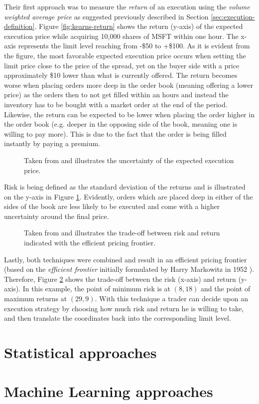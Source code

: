 Their first approach was to measure the \textit{return} of an execution using the \textit{volume weighted average price} as suggested previously described in Section \ref{sec:execution-definition}.
Figure \ref{fig:kearns-return} shows the return (y-axis) of the expected execution price while acquiring 10,000 shares of MSFT within one hour.
The x-axis represents the limit level reaching from -\$50 to +\$100.
As it is evident from the figure, the most favorable expected execution price occurs when setting the limit price close to the price of the spread, yet on the buyer side with a price approximately \$10 lower than what is currently offered.
The return becomes worse when placing orders more deep in the order book (meaning offering a lower price) as the orders then to not get filled within an hours and instead the inventory has to be bought with a market order at the end of the period.
Likewise, the return can be expected to be lower when placing the order higher in the order book (e.g. deeper in the opposing side of the book, meaning one is willing to pay more).
This is due to the fact that the order is being filled instantly by paying a premium.

\begin{figure}[H]
    \centering
    \caption{Taken from \cite{nevmyvaka2005electronic} and illustrates the uncertainty of the expected execution price.}
    \label{fig:kearns-std}
\end{figure}

Risk is being defined as the standard deviation of the returns and is illustrated on the y-axis in Figure \ref{fig:kearns-std}.
Evidently, orders which are placed deep in either of the sides of the book are less likely to be executed and come with a higher uncertainty around the final price.

\begin{figure}[H]
    \centering
    \caption{Taken from \cite{nevmyvaka2005electronic} and illustrates the trade-off between risk and return indicated with the efficient pricing frontier.}
    \label{fig:kearns-frontier}
\end{figure}

Lastly, both techniques were combined and result in an efficient pricing frontier (based on the \textit{efficient frontier} initially formulated by Harry Markowitz in 1952 \cite{markowitz1952portfolio}). Therefore, Figure \ref{fig:kearns-frontier} shows the trade-off between the risk (x-axis) and return (y-axis).
In this example, the point of minimum risk is at $(8, 18)$ and the point of maximum returns at $(29, 9)$.
With this technique a trader can decide upon an execution strategy by choosing how much risk and return he is willing to take, and then translate the coordinates back into the corresponding limit level.

\section{Statistical approaches}

\section{Machine Learning approaches}